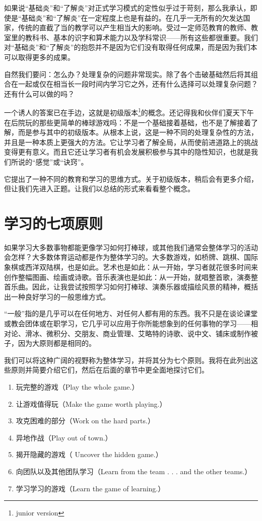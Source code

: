 如果说“基础炎”和“了解炎”对正式学习模式的定性似乎过于苛刻，那么我承认，即使是“基础炎”和“了解炎”在一定程度上也是有益的。在几乎一无所有的欠发达国家，传统的直截了当的教学可以产生相当大的影响。受过一定师范教育的教师、教室里的教科书、基本的识字和算术能力以及学科常识——所有这些都很重要。我们对“基础炎”和“了解炎”的抱怨并不是因为它们没有取得任何成果，而是因为我们本可以取得更多的成果。

自然我们要问：怎么办？处理复杂的问题非常现实。除了各个击破基础然后将其组合在一起或仅在相当长一段时间内学习它之外，还有什么选择可以处理复杂问题？还有什么可以做的吗？

一个诱人的答案已在手边，这就是初级版本\footnote{junior version}的概念。还记得我和伙伴们夏天下午在后院玩的那些更简单的棒球游戏吗：不是一个基础接着基础，也不是了解接着了解，而是参与其中的初级版本。从根本上说，这是一种不同的处理复杂性的方法，并且是一种本质上更强大的方法。它让学习者了解全局，从而使前进道路上的挑战变得更有意义。而且它还让学习者有机会发展积极参与其中的隐性知识，也就是我们所说的“感觉”或“诀窍”。

它提出了一种不同的教育和学习的思维方式。关于初级版本，稍后会有更多介绍，但让我们先进入正题。让我们以总结的形式来看看整个概念。

\section*{学习的七项原则}

如果学习大多数事物都能更像学习如何打棒球，或其他我们通常会整体学习的活动会怎样？大多数体育运动都是作为整体学习的。大多数游戏，如桥牌、跳棋、国际象棋或西洋双陆棋，也是如此。艺术也是如此：从一开始，学习者就花很多时间来创作整幅图画、绘画或诗歌。音乐表演也是如此：从一开始，就唱整首歌，演奏整首乐曲。因此，让我尝试按照学习如何打棒球、演奏乐器或描绘风景的精神，概括出一种良好学习的一般思维方式。

“一般”指的是几乎可以在任何地方、对任何人都有用的东西。我不只是在谈论课堂或教会团体或在职学习，它几乎可以应用于你所能想象到的任何事物的学习——相对论、滑冰、微积分、交朋友、商业管理、艾略特的诗歌、说中文、铺床或制作被子，因为大原则都是相同的。

我们可以将这种广阔的视野称为整体学习，并将其分为七个原则。我将在此列出这些原则并简要介绍它们，然后在后面的章节中更全面地探讨它们。
\begin{enumerate}
\item 玩完整的游戏（Play the whole game.）
\item 让游戏值得玩（Make the game worth playing.）
\item 攻克困难的部分（Work on the hard parts.）
\item 异地作战（Play out of town.）
\item 揭开隐藏的游戏（ Uncover the hidden game.）
\item 向团队以及其他团队学习（Learn from the team . . . and the other teams.）
\item 学习学习的游戏（Learn the game of learning.）
\end{enumerate}


